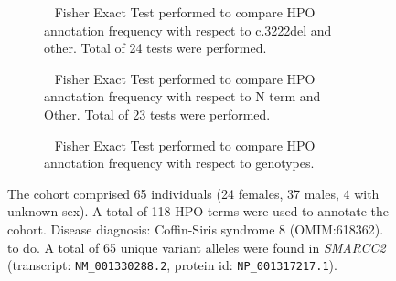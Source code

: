 \begin{figure}[htbp]
\begin{subfigure}[b]{0.95\textwidth}
\centering
{}
\captionsetup{justification=raggedright,singlelinecheck=false}
\caption{         Fisher Exact Test performed to compare HPO annotation frequency with respect to c.3222del and other. Total of
        24 tests were performed. }
\end{subfigure}
\vspace{2em}
\begin{subfigure}[b]{0.95\textwidth}
\centering
{}
\captionsetup{justification=raggedright,singlelinecheck=false}
\caption{         Fisher Exact Test performed to compare HPO annotation frequency with respect to N term and Other. Total of
        23 tests were performed. }
\end{subfigure}
\vspace{2em}
\begin{subfigure}[b]{0.95\textwidth}
\centering
{}
\captionsetup{justification=raggedright,singlelinecheck=false}
\caption{             Fisher Exact Test performed to compare HPO annotation frequency with respect to genotypes. }
\end{subfigure}

\vspace{2em}

\caption{ The cohort comprised 65 individuals (24 females, 37 males, 4 with unknown sex). A total of 118 HPO terms were used to annotate the cohort. Disease diagnosis: Coffin-Siris syndrome 8 (OMIM:618362). to do. A total of 65 unique variant alleles were found in \textit{SMARCC2} (transcript: \texttt{NM\_001330288.2}, protein id: \texttt{NP\_001317217.1}).}
\end{figure}
